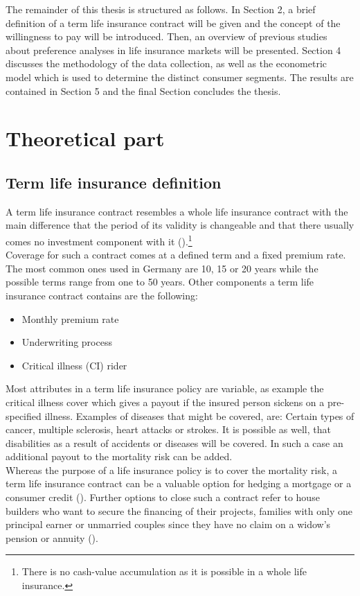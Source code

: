 \documentclass[12pt, abstracton]{article}
\begin{document}
The remainder of this thesis is structured as follows. In Section 2, a brief definition of a term life insurance contract will be given and the concept of the willingness to pay will be introduced. Then, an overview of previous studies about preference analyses in life insurance markets will be presented. Section 4 discusses the methodology of the data collection, as well as the econometric model which is used to determine the distinct consumer segments. The results are contained in Section 5 and the final Section concludes the thesis.  
\cleardoublepage
\onehalfspacing
\section{Theoretical part}
\subsection{Term life insurance definition}
A term life insurance contract resembles a whole life insurance contract with the main difference that the period of its validity is changeable and that there usually comes no investment component with it (\cite{ABI2017}).\footnote{There is no cash-value accumulation as it is possible in a whole life insurance.}\\
 Coverage for such a contract comes at a defined term and a fixed premium rate. The most common ones used in Germany are 10, 15 or 20 years while the possible terms range from one to 50 years. Other components a term life insurance contract contains are the following:
 \begin{itemize}
 	\item Monthly premium rate
 	\item Underwriting process
 	\item Critical illness (CI) rider
 \end{itemize}
Most attributes in a term life insurance policy are variable, as example the critical illness cover which gives a payout if the insured person sickens on a pre-specified illness. Examples of diseases that might be covered, are: Certain types of cancer, multiple sclerosis, heart attacks or strokes. It is possible as well, that disabilities as a result of accidents or diseases will be covered. In such a case an additional payout to the mortality risk can be added.\\
Whereas the purpose of a life insurance policy is to cover the mortality risk, a term life insurance contract can be a valuable option for hedging a mortgage or a consumer credit (\cite{GablerWirtschaftslexikon2017}). Further options to close such a contract refer to house builders who want to secure the financing of their projects, families with only one principal earner or unmarried couples since they have no claim on a widow’s pension or annuity (\cite{GDV2017}).\\ 
\end{document}
